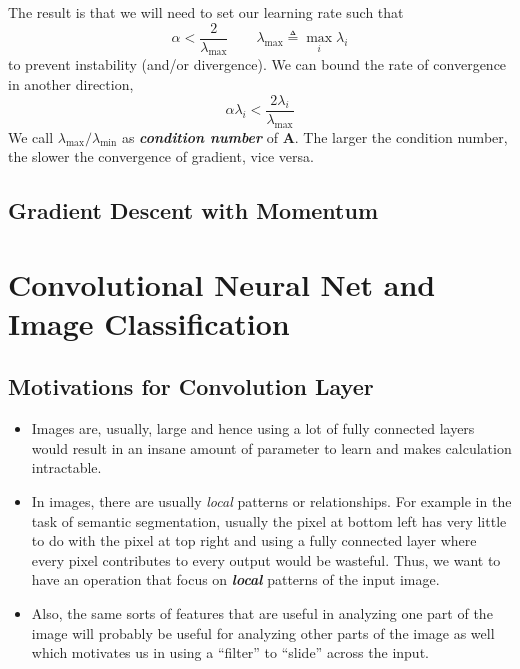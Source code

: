 \documentclass[11pt]{article}
\begin{document}
The result is that we will need to set our learning rate such that
\begin{equation}
    \alpha < \frac{2}{\lambda_{\max}} \quad\quad \lambda_{\max} \triangleq \max_i \lambda_i
\end{equation}
to prevent instability (and/or divergence).  We can bound the rate of convergence in another direction, 
\begin{equation}
    \alpha \lambda_{i}<\frac{2 \lambda_{i}}{\lambda_{\max }}
\end{equation}
We call $\lambda_{\max} / \lambda_{\min}$ as \textit{\textbf{condition number}} of $\mathbf{A}$. The larger the condition number, the slower the convergence of gradient, vice versa. 


\subsection{Gradient Descent with Momentum}






\section{Convolutional Neural Net and Image Classification}
\subsection{Motivations for Convolution Layer}
\begin{itemize}
    \item Images are, usually, large and hence using a lot of fully connected layers would result in an insane amount of parameter to learn and makes calculation intractable.
    \item In images, there are usually \textit{local} patterns or relationships. For example in the task of semantic segmentation, usually the pixel at bottom left has very little to do with the pixel at top right and using a fully connected layer where every pixel contributes to every output would be wasteful. Thus, we want to have an operation that focus on \textit{\textbf{local}} patterns of the input image.
    \item Also, the same sorts of features that are useful in analyzing one part of the image will probably be useful for analyzing other parts of the image as well which motivates us in using a ``filter'' to ``slide'' across the input. 
\end{itemize}
\end{document}
